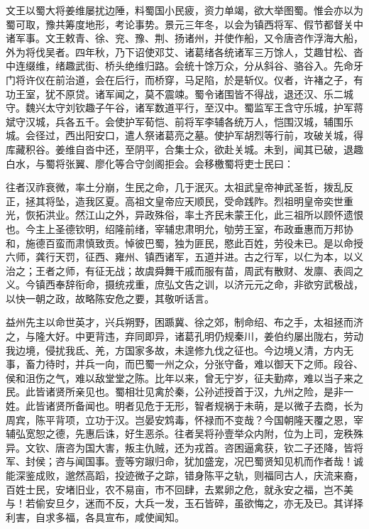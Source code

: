 \documentclass[12pt,UTF8]{ctexbook}
\begin{document}
文王以蜀大将姜维屡扰边陲，料蜀国小民疲，资力单竭，欲大举图蜀。惟会亦以为蜀可取，豫共筹度地形，考论事势。景元三年冬，以会为镇西将军、假节都督关中诸军事。文王敕青、徐、兖、豫、荆、扬诸州，并使作船，又令唐咨作浮海大船，外为将伐吴者。四年秋，乃下诏使邓艾、诸葛绪各统诸军三万馀人，艾趣甘松、沓中连缀维，绪趣武街、桥头绝维归路。会统十馀万众，分从斜谷、骆谷入。先命牙门将许仪在前治道，会在后行，而桥穿，马足陷，於是斩仪。仪者，许褚之子，有功王室，犹不原贷。诸军闻之，莫不震竦。蜀令诸围皆不得战，退还汉、乐二城守。魏兴太守刘钦趣子午谷，诸军数道平行，至汉中。蜀监军王含守乐城，护军蒋斌守汉城，兵各五千。会使护军荀恺、前将军李辅各统万人，恺围汉城，辅围乐城。会径过，西出阳安口，遣人祭诸葛亮之墓。使护军胡烈等行前，攻破关城，得库藏积谷。姜维自沓中还，至阴平，合集士众，欲赴关城。未到，闻其已破，退趣白水，与蜀将张翼、廖化等合守剑阁拒会。会移檄蜀将吏士民曰：

往者汉祚衰微，率土分崩，生民之命，几于泯灭。太祖武皇帝神武圣哲，拨乱反正，拯其将坠，造我区夏。高祖文皇帝应天顺民，受命践阼。烈祖明皇帝奕世重光，恢拓洪业。然江山之外，异政殊俗，率土齐民未蒙王化，此三祖所以顾怀遗恨也。今主上圣德钦明，绍隆前绪，宰辅忠肃明允，劬劳王室，布政垂惠而万邦协和，施德百蛮而肃慎致贡。悼彼巴蜀，独为匪民，愍此百姓，劳役未已。是以命授六师，龚行天罚，征西、雍州、镇西诸军，五道并进。古之行军，以仁为本，以义治之；王者之师，有征无战；故虞舜舞干戚而服有苗，周武有散财、发廪、表闾之义。今镇西奉辞衔命，摄统戎重，庶弘文告之训，以济元元之命，非欲穷武极战，以快一朝之政，故略陈安危之要，其敬听话言。

益州先主以命世英才，兴兵朔野，困踬冀、徐之郊，制命绍、布之手，太祖拯而济之，与隆大好。中更背违，弃同即异，诸葛孔明仍规秦川，姜伯约屡出陇右，劳动我边境，侵扰我氐、羌，方国家多故，未遑修九伐之征也。今边境乂清，方内无事，畜力待时，并兵一向，而巴蜀一州之众，分张守备，难以御天下之师。段谷、侯和沮伤之气，难以敌堂堂之陈。比年以来，曾无宁岁，征夫勤瘁，难以当子来之民。此皆诸贤所亲见也。蜀相壮见禽於秦，公孙述授首于汉，九州之险，是非一姓。此皆诸贤所备闻也。明者见危于无形，智者规祸于未萌，是以微子去商，长为周宾，陈平背项，立功于汉。岂晏安鸩毒，怀禄而不变哉？今国朝隆天覆之恩，宰辅弘宽恕之德，先惠后诛，好生恶杀。往者吴将孙壹举众内附，位为上司，宠秩殊异。文钦、唐咨为国大害，叛主仇贼，还为戎首。咨困逼禽获，钦二子还降，皆将军、封侯；咨与闻国事。壹等穷踧归命，犹加盛宠，况巴蜀贤知见机而作者哉！诚能深鉴成败，邈然高蹈，投迹微子之踪，错身陈平之轨，则福同古人，庆流来裔，百姓士民，安堵旧业，农不易亩，巿不回肆，去累卵之危，就永安之福，岂不美与！若偷安旦夕，迷而不反，大兵一发，玉石皆碎，虽欲悔之，亦无及已。其详择利害，自求多福，各具宣布，咸使闻知。
\end{document}
